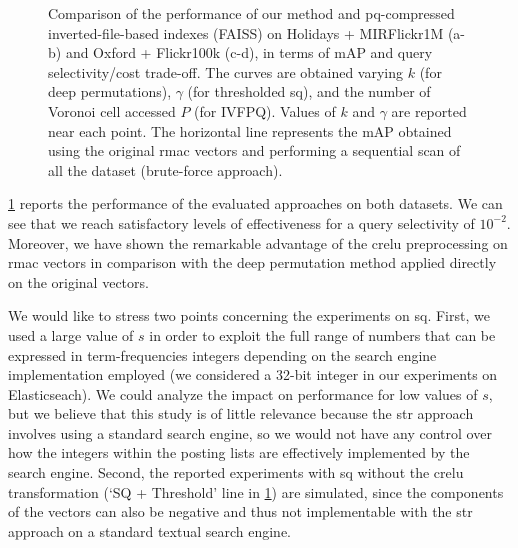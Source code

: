 \begin{figure}
\caption{Comparison of the performance of our method and \gls{pq}-compressed inverted-file-based indexes (FAISS) on Holidays + MIRFlickr1M (a-b) and Oxford + Flickr100k (c-d), in terms of mAP and query selectivity/cost trade-off.
The curves are obtained varying $k$ (for deep permutations), $\gamma$ (for thresholded \gls{sq}), and the number of Voronoi cell accessed $P$ (for IVFPQ).
Values of $k$ and $\gamma$ are reported near each point.
The horizontal line represents the \gls{mAP} obtained using the original \gls{rmac} vectors and performing a sequential scan of all the dataset (brute-force approach).
}
\label{fig:str:results}
\end{figure}

\ref{fig:str:results} reports the performance of the evaluated approaches on both datasets.
We can see that we reach satisfactory levels of effectiveness for a query selectivity of $10^{-2}$.
Moreover, we have shown the remarkable advantage of the \gls{crelu} preprocessing on \gls{rmac} vectors in comparison with the deep permutation method applied directly on the original vectors.

We would like to stress two points concerning the experiments on \gls{sq}.
First, we used a large value of $s$ in order to exploit the full range of numbers that can be expressed in term-frequencies integers depending on the search engine implementation employed (we considered a 32-bit integer in our experiments on Elasticseach).
We could analyze the impact on performance for low values of $s$, but we believe that this study is of little relevance because the \gls{str} approach involves using a standard search engine, so we would not have any control over how the integers within the posting lists are effectively implemented by the search engine.
Second, the reported experiments with \gls{sq} without the \gls{crelu} transformation (`SQ + Threshold' line in \ref{fig:str:results}) are simulated, since the components of the vectors can also be negative and thus not implementable with the \gls{str} approach on a standard textual search engine.

